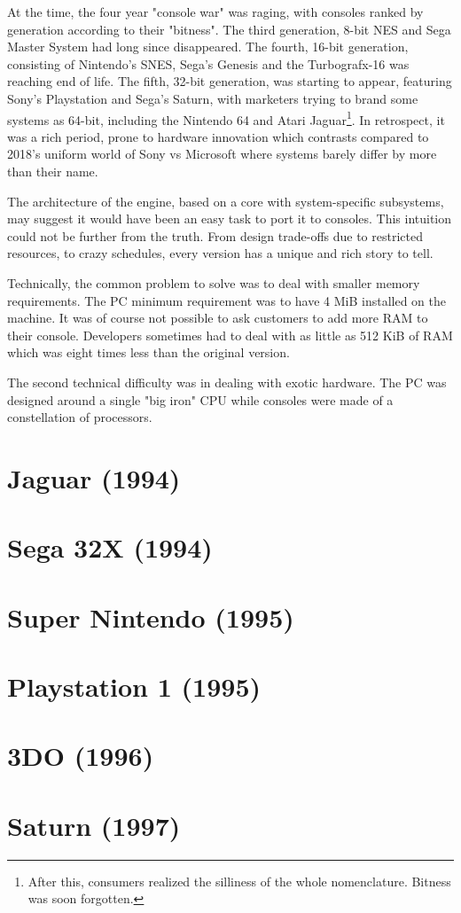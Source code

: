 At the time, the four year "console war" was raging, with consoles ranked by generation according to their "bitness". The third generation, 8-bit NES and Sega Master System had long since disappeared. The fourth, 16-bit generation, consisting of Nintendo's SNES, Sega's Genesis and the Turbografx-16 was reaching end of life. The fifth, 32-bit generation, was starting to appear, featuring Sony's Playstation and Sega's Saturn, with marketers trying to brand some systems as 64-bit, including the Nintendo 64 and Atari Jaguar\footnote{After this, consumers realized the silliness of the whole nomenclature. Bitness was soon forgotten.}. In retrospect, it was a rich period, prone to hardware innovation which contrasts compared to 2018's uniform world of Sony vs Microsoft where systems barely differ by more than their name.\\
\par
The architecture of the \doom{} engine, based on a core with system-specific subsystems, may suggest it would have been an easy task to port it to consoles. This intuition could not be further from the truth. From design trade-offs due to restricted resources, to crazy schedules, every version has a unique and rich story to tell.\\
\par
Technically, the common problem to solve was to deal with smaller memory requirements. The PC minimum requirement was to have 4 MiB installed on the machine. It was of course not possible to ask customers to add more RAM to their console. Developers sometimes had to deal with as little as 512 KiB of RAM which was eight times less than the original version.\\
\par
The second technical difficulty was in dealing with exotic hardware. The PC was designed around a single "big iron" CPU while consoles were made of a constellation of processors.


\section{Jaguar (1994)}
 

\section{Sega 32X (1994)}
 

\section{Super Nintendo (1995)}


\section{Playstation 1 (1995)}


\section{3DO (1996)}


\section{Saturn (1997)}


